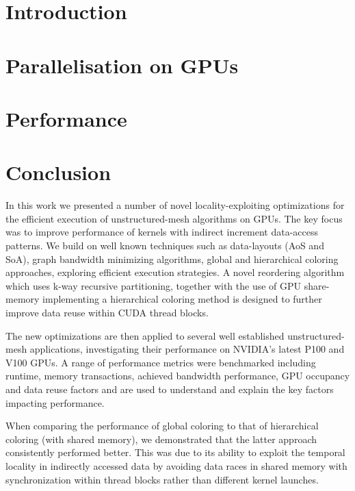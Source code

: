 \documentclass[number]{elsarticle}
\begin{document}
\section{Introduction}\label{introduction}



\section{Parallelisation on GPUs}\label{parallelisation-on-gpu}



\section{Performance}\label{performance}




\section{Conclusion}\label{conclusion}

In this work we presented a number of novel locality-exploiting optimizations 
for the efficient execution of unstructured-mesh algorithms on GPUs. The key 
focus was to improve performance of kernels with indirect increment data-access 
patterns. We build on well known techniques such as data-layouts (AoS and SoA), 
graph bandwidth minimizing algorithms, global and hierarchical coloring 
approaches, exploring efficient execution strategies. A novel reordering 
algorithm which uses k-way recursive partitioning, together with the use of GPU 
share-memory implementing a hierarchical coloring method is designed to further 
improve data reuse within CUDA thread blocks.

The new optimizations are then applied to several well established unstructured-
mesh applications, investigating their performance on NVIDIA’s latest P100
and V100 GPUs. A range of performance metrics were benchmarked including 
runtime, memory transactions, achieved bandwidth performance, GPU occupancy and 
data reuse factors and are used to understand and explain the key factors 
impacting performance.

When comparing the performance of global coloring to that of hierarchical 
coloring (with shared memory), we demonstrated that the latter approach 
consistently performed better. This was due to its ability to exploit the 
temporal locality in indirectly accessed data by avoiding data races in shared 
memory with synchronization within thread blocks rather than different kernel 
launches.
\end{document}
